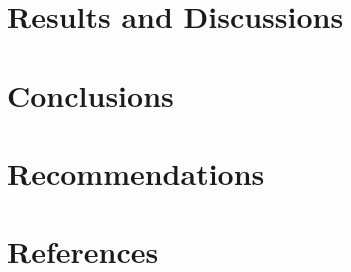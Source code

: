 \documentclass{book}
\begin{document}
\chapter{Results and Discussions}
\label{cha:results-discussions}

% 

\chapter{Conclusions}
\label{cha:conclusions}


\chapter{Recommendations}
\label{cha:recommendations}


\chapter{References}
\label{cha:references}



\appendix{}
\renewcommand{\thechapter}{\Alph{chapter}}

\end{document}
